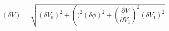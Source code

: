 \begin{equation}
\label{eq:delta_V_Malus}
\left(\delta V\right) = \sqrt{ (\delta V_0)^2 + \left()^2 (\delta \phi)^2 + \left( \frac{\partial{V}}{\partial{V_1}}\right)^2 (\delta V_1)^2}
\end{equation}
